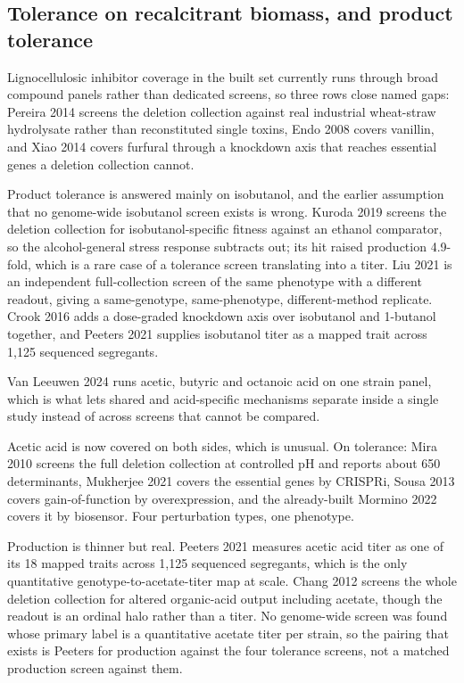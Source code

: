\subsection{Tolerance on recalcitrant biomass, and product tolerance}

Lignocellulosic inhibitor coverage in the built set currently runs through broad compound panels rather than dedicated screens, so
three rows close named gaps: Pereira 2014 screens the deletion collection against
real industrial wheat-straw hydrolysate rather than reconstituted single toxins, Endo 2008 covers vanillin, and Xiao 2014 covers furfural through a knockdown axis
that reaches essential genes a deletion collection cannot.

Product tolerance is answered mainly on isobutanol, and the earlier assumption that no
genome-wide isobutanol screen exists is wrong. Kuroda 2019 screens the deletion
collection for isobutanol-specific fitness against an ethanol comparator, so the
alcohol-general stress response subtracts out; its  hit raised production
4.9-fold, which is a rare case of a tolerance screen translating into a titer. Liu 2021 is an independent full-collection screen of the same phenotype with a different
readout, giving a same-genotype, same-phenotype, different-method replicate. Crook 2016 adds a dose-graded knockdown axis over isobutanol and 1-butanol together, and
Peeters 2021 supplies isobutanol titer as a mapped trait across 1,125 sequenced
segregants.

Van Leeuwen 2024 runs acetic, butyric and octanoic acid on one strain panel, which is what
lets shared and acid-specific mechanisms separate inside a single study instead of across
screens that cannot be compared.

 Acetic acid is now covered on both
sides, which is unusual. On tolerance: Mira 2010 screens the full deletion collection at
controlled pH and reports about 650 determinants, Mukherjee 2021 covers the essential genes
by CRISPRi, Sousa 2013 covers gain-of-function by overexpression, and the already-built
Mormino 2022 covers it by biosensor. Four perturbation types, one phenotype.

Production is thinner but real. Peeters 2021 measures acetic acid titer as one of its 18
mapped traits across 1,125 sequenced segregants, which is the only quantitative
genotype-to-acetate-titer map at scale. Chang 2012 screens the whole deletion collection for
altered organic-acid output including acetate, though the readout is an ordinal halo rather
than a titer. No genome-wide screen was found whose primary label is a quantitative acetate
titer per strain, so the pairing that exists is Peeters for production against the four
tolerance screens, not a matched production screen against them.

